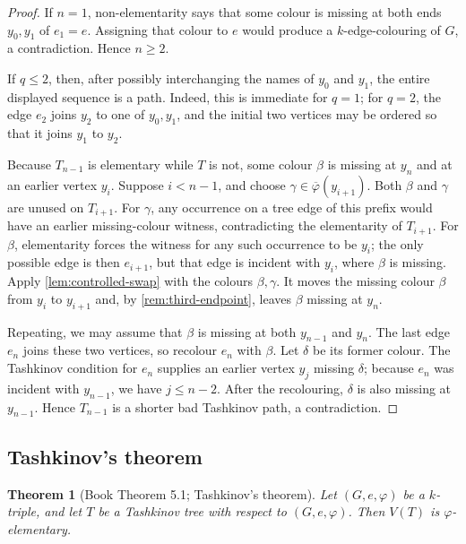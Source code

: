 \documentclass[11pt]{article}
\newtheorem{theorem}{Theorem}[section]
\theoremstyle{definition}
\newcommand{\missing}[1]{\overline{#1}}
\begin{document}
\begin{proof}
If $n=1$, non-elementarity says that some colour is missing at both ends
$y_0,y_1$ of $e_1=e$.  Assigning that colour to $e$ would produce a
$k$-edge-colouring of $G$, a contradiction.  Hence $n\ge2$.

If $q\le2$, then, after possibly interchanging the names of $y_0$ and $y_1$,
the entire displayed sequence is a path.  Indeed, this is immediate for
$q=1$; for $q=2$, the edge $e_2$ joins $y_2$ to one of $y_0,y_1$, and the
initial two vertices may be ordered so that it joins $y_1$ to $y_2$.

Because $T_{n-1}$ is elementary while $T$ is not, some colour $\beta$ is
missing at $y_n$ and at an earlier vertex $y_i$.  Suppose $i<n-1$, and choose
$\gamma\in\missing\varphi(y_{i+1})$.  Both $\beta$ and $\gamma$ are unused on
$T_{i+1}$.  For $\gamma$, any occurrence on a tree edge of this prefix would
have an earlier missing-colour witness, contradicting the elementarity of
$T_{i+1}$.  For $\beta$, elementarity forces the witness for any such
occurrence to be $y_i$; the only possible edge is then $e_{i+1}$, but that edge
is incident with $y_i$, where $\beta$ is missing.  Apply
\cref{lem:controlled-swap} with the colours $\beta,\gamma$.  It moves the
missing colour $\beta$ from $y_i$ to $y_{i+1}$ and, by
\cref{rem:third-endpoint}, leaves $\beta$ missing at $y_n$.

Repeating, we may assume that $\beta$ is missing at both $y_{n-1}$ and $y_n$.
The last edge $e_n$ joins these two vertices, so recolour $e_n$ with $\beta$.
Let $\delta$ be its former colour.  The Tashkinov condition for $e_n$ supplies
an earlier vertex $y_j$ missing $\delta$; because $e_n$ was incident with
$y_{n-1}$, we have $j\le n-2$.  After the recolouring, $\delta$ is also missing
at $y_{n-1}$.  Hence $T_{n-1}$ is a shorter bad Tashkinov path, a contradiction.
\end{proof}

\subsection{Tashkinov's theorem}

\begin{theorem}[Book Theorem 5.1; Tashkinov's theorem]
\label{thm:tashkinov}\label{TashTree}
Let $(G,e,\varphi)$ be a $k$-triple, and let $T$ be a Tashkinov tree with
respect to $(G,e,\varphi)$.  Then $V(T)$ is $\varphi$-elementary.
\end{theorem}
\end{document}

